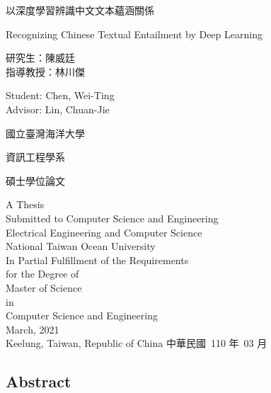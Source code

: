 \documentclass[12pt]{article}
\begin{document}
\begin{CJK*}{UTF8}{bkai}
  \newpage
  \begin{titlepage}
    \centering
  {\LARGE 以深度學習辨識中文文本蘊涵關係\par}
  \vfill
  {\Large Recognizing Chinese Textual Entailment by Deep Learning\par}
  \vfill
  {
    \Large
    \begin{minipage}{2in}
      研究生：陳威廷 \\
      指導教授：林川傑
    \end{minipage}
    \hfill
    \begin{minipage}{2.4in}
      Student: Chen, Wei-Ting \\
      Advisor: Lin, Chuan-Jie
    \end{minipage}
    \par
    }
    \vfill
    {\LARGE 國立臺灣海洋大學\par}
    {\LARGE 資訊工程學系\par}
    {\LARGE 碩士學位論文\par}
    \vfill
    {
      \LARGE
      A Thesis \\
      Submitted to Computer Science and Engineering \\
      Electrical Engineering and Computer Science \\
      National Taiwan Ocean University \\
      In Partial Fulfillment of the Requirements \\
      for the Degree of \\
      Master of Science \\
      in \\
      Computer Science and Engineering \\
      March, 2021 \\ \vspace{0.5cm}
      Keelung, Taiwan, Republic of China
      }
      \vfill
      {\LARGE 中華民國\ 110 年\ 03 月}
\end{titlepage}
\ClearWallPaper
{}

\newpage

\begin{spacing}{1.77}
\section*{Abstract}

\end{spacing}
\end{CJK*}
\end{document}
